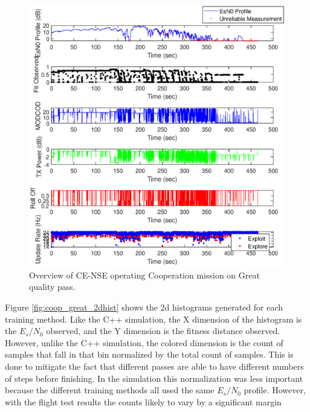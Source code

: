 \begin{figure}[ht]
\centering
\includegraphics[width=\textwidth]{figures/flight_results/coop_great_nse_overview.eps}
\caption{Overview of CE-NSE operating Cooperation mission on Great quality pass.}
\label{fig:flight_nse_coop_great_overview}
\end{figure}


\par Figure \ref{fig:coop_great_2dhist} shows the 2d histograms generated for each training method. Like the C++ simulation, the X dimension of the histogram is the $E_s/N_0$ observed, and the Y dimension is the fitness distance observed. However, unlike the C++ simulation, the colored dimension is the count of samples that fall in that bin normalized by the total count of samples. This is done to mitigate the fact that different passes are able to have different numbers of steps before finishing. In the simulation this normalization was less important because the different training methods all used the same $E_s/N_0$ profile. However, with the flight test results the counts likely to vary by a significant margin

